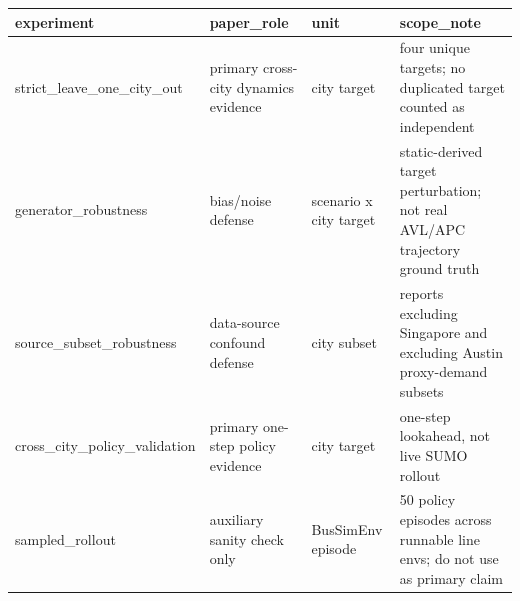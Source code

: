 \begin{tabular}{llll}
\toprule
experiment & paper\_role & unit & scope\_note \\
\midrule
strict\_leave\_one\_city\_out & primary cross-city dynamics evidence & city target & four unique targets; no duplicated target counted as independent \\
generator\_robustness & bias/noise defense & scenario x city target & static-derived target perturbation; not real AVL/APC trajectory ground truth \\
source\_subset\_robustness & data-source confound defense & city subset & reports excluding Singapore and excluding Austin proxy-demand subsets \\
cross\_city\_policy\_validation & primary one-step policy evidence & city target & one-step lookahead, not live SUMO rollout \\
sampled\_rollout & auxiliary sanity check only & BusSimEnv episode & 50 policy episodes across runnable line envs; do not use as primary claim \\
\bottomrule
\end{tabular}
